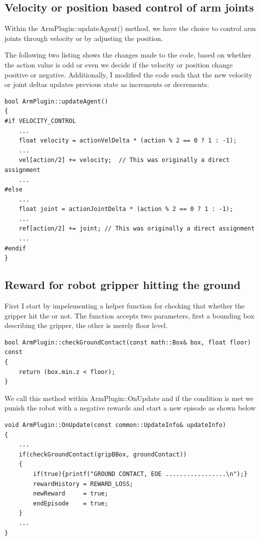 \documentclass{article}
\begin{document}
\subsection{Velocity or position based control of arm joints}
Within the  ArmPlugin::updateAgent() method, we have the choice to control arm joints through velocity or by adjusting the position.

The following two listing shows the changes made to the code, based on whether the action value is odd or even we decide if the velocity or position change positive or negative. Additionally, I modified the code such that the new velocity or joint deltas updates previous state as increments or decrements.


\begin{lstlisting}
bool ArmPlugin::updateAgent()
{
#if VELOCITY_CONTROL
    ...
    float velocity = actionVelDelta * (action % 2 == 0 ? 1 : -1);
    ...
    vel[action/2] += velocity;  // This was originally a direct assignment
    ...
#else
    ...
    float joint = actionJointDelta * (action % 2 == 0 ? 1 : -1);
    ...
    ref[action/2] += joint; // This was originally a direct assignment 
    ...
#endif
}
\end{lstlisting}

\subsection{Reward for robot gripper hitting the ground}

First I start by impelementing a helper function for checking that whether the gripper hit the or not. The function accepts two parameters, first a bounding box describing the gripper, the other is merely floor level.
\begin{lstlisting}
bool ArmPlugin::checkGroundContact(const math::Box& box, float floor) const
{
	return (box.min.z < floor);
}
\end{lstlisting}

We call this method within ArmPlugin::OnUpdate and if the condition is met we punish the robot with a negative rewards and start a new episode as shown below 
\begin{lstlisting}
void ArmPlugin::OnUpdate(const common::UpdateInfo& updateInfo)
{
	...
	if(checkGroundContact(gripBBox, groundContact))
	{
		if(true){printf("GROUND CONTACT, EOE .................\n");}
		rewardHistory = REWARD_LOSS;
		newReward     = true;
		endEpisode    = true;
	}
	...
}
\end{lstlisting}
\end{document}
